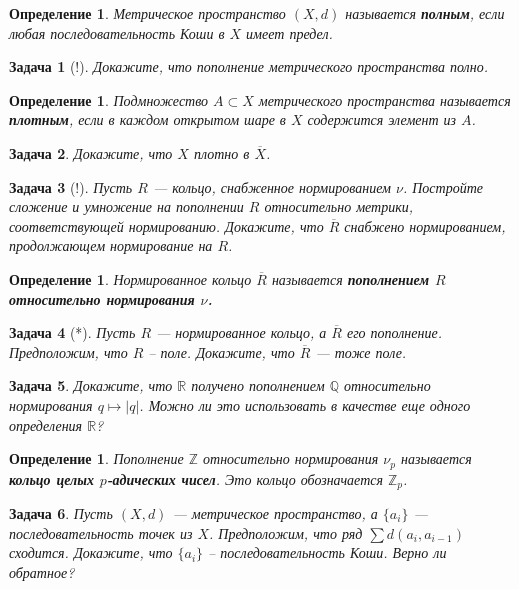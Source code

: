 \documentclass[12pt]{book}
\def\Z{{\mathbb Z}}
\def\R{{\mathbb R}}
\def\Q{{\mathbb Q}}
\theoremstyle{upshape}
\newtheorem{zadacha}{Задача}[chapter]
\theoremstyle{generic}
\newtheorem{opredelenie}[teorema]{Определение}
\theoremstyle{upshapenonumber}
\newcommand{\следствие}{%
     \refstepcounter{teorema}
     {\noindent\bf Следствие \thechapter.\arabic{teorema}:\ }}
\newcommand{\пример}{%
     \refstepcounter{teorema}
     {\noindent\bf Пример \thechapter.\arabic{teorema}:\ }}
\newcommand{\лемма}{%
     \refstepcounter{teorema}
     {\noindent\bf Лемма \thechapter.\arabic{teorema}:\ }}
\newcommand{\теорема}{%
     \refstepcounter{teorema}
     {\noindent\bf Теорема \thechapter.\arabic{teorema}:\ }}
\newcommand{\утверждение}{%
     \refstepcounter{teorema}
     {\noindent\bf Утверждение \thechapter.\arabic{teorema}:\ }}
\begin{document}
{\begin{opredelenie}
Метрическое пространство $(X,d)$ называется {\bf полным}, если любая
последовательность Коши в $X$ имеет предел.
\end{opredelenie}

\begin{zadacha}[!] Докажите, что пополнение 
метрического пространства полно.
\end{zadacha}

\begin{opredelenie} Подмножество $A \subset X$ метрического
пространства называется {\bf плотным}, если в каждом открытом шаре в
$X$ содержится элемент из $A$.
\end{opredelenie}

\begin{zadacha} Докажите, что $X$ плотно в $\overline{X}$.
\end{zadacha}

\begin{zadacha}[!] Пусть $R$ --- кольцо, снабженное нормированием $\nu$.
Постройте сложение и умножение на пополнении $R$ относительно
метрики, соответствующей нормированию. Докажите, что $\overline{R}$
снабжено нормированием, продолжающем нормирование на $R$.
\end{zadacha}

\begin{opredelenie} Нормированное кольцо $\overline{R}$ называется
{\bf пополнением $R$ относительно нормирования $\nu$.}
\end{opredelenie}

\begin{zadacha}[*] Пусть $R$ --- нормированное кольцо, 
а $\overline{R}$ его пополнение.  Предположим, что $R$ --
поле. Докажите, что $\overline{R}$ --- тоже поле.
\end{zadacha}

\begin{zadacha} Докажите, что $\R$ получено пополнением
$\Q$ относительно нормирования $q \mapsto |q|$. Можно ли это использовать в
качестве еще одного определения $\R$?
\end{zadacha}

\begin{opredelenie} Пополнение $\Z$ относительно нормирования
$\nu_p$ называется {\bf кольцо целых $p$-адических чисел}. Это
кольцо обозначается $\Z_p$.
\end{opredelenie}

\begin{zadacha} Пусть $(X, d)$ --- метрическое пространство,
а $\{a_i\}$ --- последовательность точек из $X$.  Предположим, что
ряд $\sum d(a_i, a_{i-1})$ сходится. Докажите, что $\{a_i\}$ --
последовательность Коши. Верно ли обратное?
\end{zadacha}

}
\end{document}
